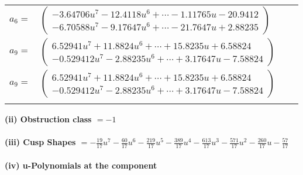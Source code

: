 \documentclass[1p]{elsarticle_modified}
\theoremstyle{definition}
\begin{document}
\begin{tabular}{m{7pt} m{180pt} m{7pt} m{180pt} }
\flushright $a_{6}=$&$\begin{pmatrix}-3.64706 u^{7}-12.4118 u^{6}+\cdots-1.11765 u-20.9412\\-6.70588 u^{7}-9.17647 u^{6}+\cdots-21.7647 u+2.88235\end{pmatrix}$ \\
\flushright $a_{9}=$&$\begin{pmatrix}6.52941 u^{7}+11.8824 u^{6}+\cdots+15.8235 u+6.58824\\-0.529412 u^{7}-2.88235 u^{6}+\cdots+3.17647 u-7.58824\end{pmatrix}$\\ \flushright $a_{9}=$&$\begin{pmatrix}6.52941 u^{7}+11.8824 u^{6}+\cdots+15.8235 u+6.58824\\-0.529412 u^{7}-2.88235 u^{6}+\cdots+3.17647 u-7.58824\end{pmatrix}$\\&\end{tabular}
\flushleft \textbf{(ii) Obstruction class $= -1$}\\~\\
\flushleft \textbf{(iii) Cusp Shapes $= -\frac{19}{17} u^7-\frac{60}{17} u^6-\frac{219}{17} u^5-\frac{389}{17} u^4-\frac{613}{17} u^3-\frac{571}{17} u^2-\frac{260}{17} u-\frac{57}{17}$}\\~\\
\newpage\renewcommand{\arraystretch}{1}
\flushleft \textbf{(iv) u-Polynomials at the component}\newline \\
\end{document}
